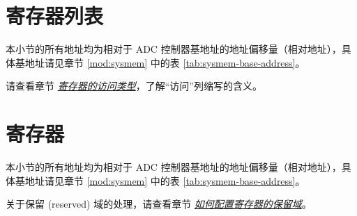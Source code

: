 \documentclass[main\_\_CN.tex]{subfiles}
\begin{document}

\clearpage
\hypertarget{adc-reg-summ}{}
\section{寄存器列表}
\label{sec:adc-reg-summ}

本小节的所有地址均为相对于 ADC 控制器基地址的地址偏移量（相对地址），具体基地址请见章节 \ref{mod:sysmem} \textit{} 中的表 \ref{tab:sysmem-base-address}。

请查看章节 \hyperref[glossary-access-types]{\textit{寄存器的访问类型}}，了解“访问”列缩写的含义。






\clearpage
\section{寄存器}

本小节的所有地址均为相对于 ADC 控制器基地址的地址偏移量（相对地址），具体基地址请见章节 \ref{mod:sysmem} \textit{} 中的表 \ref{tab:sysmem-base-address}。

关于保留 (reserved) 域的处理，请查看章节 \hyperref[programming-reserved-field]{\textit{如何配置寄存器的保留域}}。


\end{document}
